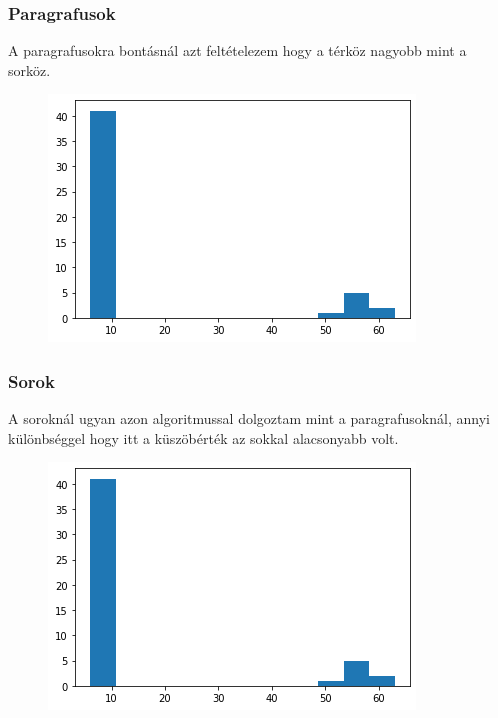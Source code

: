 \documentclass{beamer}
\begin{document}
\begin{frame}[fragile]
\frametitle{Paragrafusok}

A paragrafusokra bontásnál azt feltételezem hogy a térköz nagyobb mint a sorköz.

\bigskip

\begin{figure}[!tbp]
  \centering
  \begin{minipage}[b]{0.7\textwidth}
    \includegraphics[width=\textwidth]{images/segment_hist.png}
  \end{minipage}
\end{figure}

\end{frame}

\begin{frame}[fragile]
\frametitle{Sorok}

A soroknál ugyan azon algoritmussal dolgoztam mint a paragrafusoknál, annyi különbséggel hogy itt a küszöbérték az sokkal alacsonyabb volt.

\bigskip

\begin{figure}[!tbp]
  \centering
  \begin{minipage}[b]{0.7\textwidth}
    \includegraphics[width=\textwidth]{images/segment_hist.png}
  \end{minipage}
\end{figure}

\end{frame}
\end{document}

